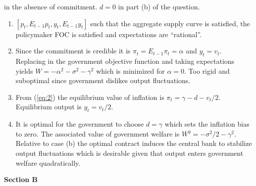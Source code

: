 \documentclass[12pt,a4]{article}
\begin{document}
\begin{enumerate}
in the absence of commitment. $d=0$ in part (b) of the question. 
\begin{enumerate}
\item $\left[p_{t},E_{t-1}p_{t},y_{t},E_{t-1}y_{t}\right]$ such that
  the aggregate supply curve is satisfied, the policymaker FOC is
  satisfied and expectations are ``rational''.
\item Since the commitment is credible it is
  $\pi_{t}=E_{t-1}\pi_{t}=\alpha$ and $y_{t}=v_{t}.$ Replacing in the
  government objective function and taking expectations yields
  $W=-\alpha^{2}-\sigma^{2}-\gamma^{2}$ which is minimized
  for $\alpha=0.$ Too rigid and suboptimal since government dislikes
  output fluctuations.

\item  From  (\ref{eq:2}) the equilibrium value of inflation is
  $\pi_{t}=\gamma-d-v_{t}/2.$ Equilibrium output is $y_{t}=v_{t}/2.$

\item  It is optimal for the government to choose $d=\gamma$ which
  sets the inflation bias to zero. The associated value of government
  welfare is $W^{g}=-\sigma^{2}/2-\gamma^{2}.$ Relative to case (b) the optimal
  contract induces the central bank to stabilize output fluctuations
  which is desirable given that output enters government welfare quadratically.
\end{enumerate}
\end{enumerate}
\newpage
\textbf{Section B}
\end{document}
